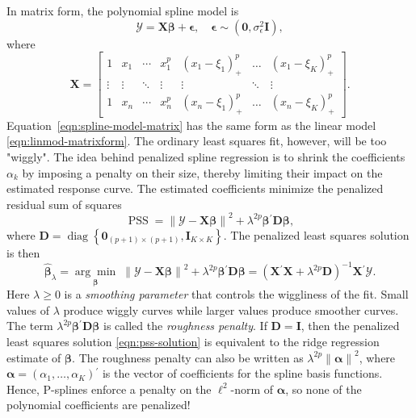 \documentclass[cmfont,usenames,dvipsnames,leqno]{afit-etd}\usepackage[]{graphicx}\usepackage[]{color}
\newcommand{\norm}[1]{\left\|#1\right\|}
\newcommand{\trans}{\ensuremath{^\prime}}
\newcommand{\bc}[1]{\ensuremath{\bm{\mathcal{#1}}}}
\newcommand{\wh}[1]{\ensuremath{\widehat{#1}}}
\newcommand{\argmin}[1]{\underset{#1}{\operatorname{arg}\!\operatorname{min}}\;}
\newcommand{\diag}{\operatorname{diag}}
\newcommand{\PSS}{\operatorname{PSS}}
\newcommand{\X}{\ensuremath{\bm{X}}}
\begin{document}
In matrix form, the polynomial spline model is
\begin{equation}
\label{eqn:spline-model-matrix}
  \bc{Y} = \X\bm{\beta} + \bm{\epsilon}, \quad \bm{\epsilon} \sim (\bm{0}, \sigma_\epsilon^2\bm{I}),
\end{equation}
where 
\begin{equation*}
  \X = 
    \begin{bmatrix}
      1 & x_1 & \cdots & x_1^p & (x_1-\xi_1)_+^p & \dotsc & (x_1-\xi_K)_+^p \\  
      \vdots & \vdots & \ddots & \vdots & \vdots & \ddots & \vdots \\
      1 & x_n & \cdots & x_n^p & (x_n-\xi_1)_+^p & \dotsc & (x_n-\xi_K)_+^p
    \end{bmatrix}.              
\end{equation*}
Equation~\eqref{eqn:spline-model-matrix} has the same form as the linear model \eqref{eqn:linmod-matrixform}. The ordinary least squares fit, however, will be too "wiggly". The idea behind penalized spline regression is to shrink the coefficients $\alpha_k$ by imposing a penalty on their size, thereby limiting their impact on the estimated response curve. The estimated coefficients minimize the penalized residual sum of squares
\begin{equation}
\label{eqn:pss}
  \PSS = \norm{\bc{Y} - \X\bm{\beta}}^2 + \lambda^{2p}\bm{\beta}\trans\bm{D}\bm{\beta},
\end{equation}
where $\bm{D} = \diag\left\{\bm{0}_{(p+1) \times (p+1)}, \bm{I}_{K \times K}\right\}$. The penalized least squares solution is then
\begin{equation}
\label{eqn:pss-solution}
  \wh{\bm{\beta}}_\lambda = \argmin{\bm{\beta}} \norm{\bc{Y} - \X\bm{\beta}}^2 + \lambda^{2p}\bm{\beta}\trans\bm{D}\bm{\beta} = \left( \X\trans\X + \lambda^{2p}\bm{D} \right)^{-1}\X\trans\bc{Y}.
\end{equation}
Here $\lambda \ge 0$ is a \textit{smoothing parameter} that controls the wiggliness of the fit. Small values of $\lambda$ produce wiggly curves while larger values  produce smoother curves. The term $\lambda^{2p}\bm{\beta}\trans\bm{D}\bm{\beta}$ is called the \textit{roughness penalty}. If $\bm{D} = \bm{I}$, then the penalized least squares solution \eqref{eqn:pss-solution} is equivalent to the ridge regression estimate of $\bm{\beta}$. The roughness penalty can also be written as $\lambda^{2p}\norm{\bm{\alpha}}^2$, where $\bm{\alpha} = (\alpha_1, \dotsc, \alpha_K)\trans$ is the vector of coefficients for the spline basis functions. Hence, \ac{P-spline}s enforce a penalty on the $\ell^2$-norm of $\bm{\alpha}$, so none of the polynomial coefficients are penalized! 
\end{document}
